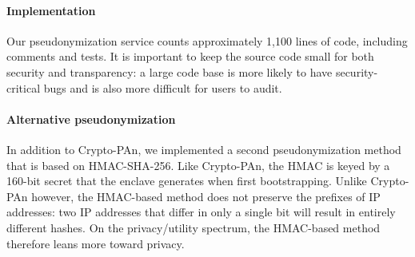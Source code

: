 \paragraph{Implementation}
Our pseudonymization service counts approximately 1,100 lines of code, including
comments and tests.  It is important to keep the source code small for both
security and transparency: a large code base is more likely to have
security-critical bugs and is also more difficult for users to audit.

\paragraph{Alternative pseudonymization}
In addition to Crypto-PAn, we implemented a second pseudonymization method that
is based on HMAC-SHA-256.  Like Crypto-PAn, the HMAC is keyed by a 160-bit
secret that the enclave generates when first bootstrapping.  Unlike Crypto-PAn
however, the HMAC-based method does not preserve the prefixes of IP addresses:
two IP addresses that differ in only a single bit will result in entirely
different hashes.  On the privacy/utility spectrum, the HMAC-based method
therefore leans more toward privacy.
\fi
